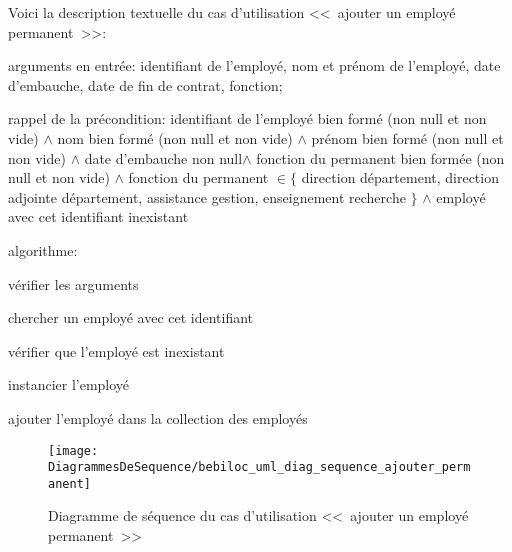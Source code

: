 \documentclass[11pt,article]{article}
\newcommand{\nullvalue}{\textsf{null}\xspace}
\begin{document}
\bigskip

\noindent
Voici la description textuelle du cas d'utilisation <<~ajouter un employé permanent~>>:
\begin{compactitem}
\item arguments en entrée: identifiant de l'employé, nom et prénom de
  l'employé, date d'embauche, date de fin de contrat, fonction;
\item rappel de la précondition: identifiant de l'employé bien formé
  (non \nullvalue et non vide) $\land$ nom bien formé (non \nullvalue
  et non vide) $\land$ prénom bien formé (non \nullvalue et non vide)
  $\land$ date d'embauche non \nullvalue $\land$ fonction du permanent
  bien formée (non \nullvalue et non vide) $\land$ fonction du
  permanent $\in \{$ direction département, direction adjointe
  département, assistance gestion, enseignement recherche $\}$ $\land$
  employé avec cet identifiant inexistant
\item algorithme:
\begin{compactenum}
\item vérifier les arguments
\item chercher un employé avec cet identifiant
\item vérifier que l'employé est inexistant
\item instancier l'employé
\item ajouter l'employé dans la collection des employés
\end{compactenum}
\end{compactitem}

\begin{figure}[ht!]
\begin{center}
\texttt{[image: DiagrammesDeSequence/bebiloc\_uml\_diag\_sequence\_ajouter\_permanent]}
\caption{Diagramme de séquence du cas d'utilisation <<~ajouter un
  employé permanent~>>}
\end{center}
\label{umlet_diag_sequence_ajouter_non_permanent}
\end{figure}

\newpage~\newpage
\end{document}
